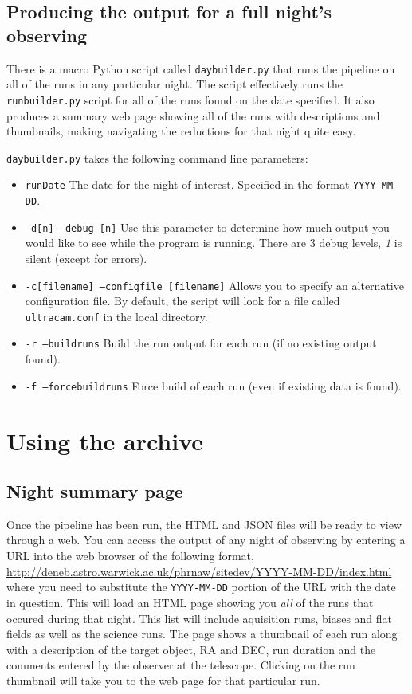 \subsection{Producing the output for a full night's observing}
There is a macro Python script called \texttt{daybuilder.py} that runs the pipeline on all of the runs in any particular night. The script effectively runs the \texttt{runbuilder.py} script for all of the runs found on the date specified. It also produces a summary web page showing all of the runs with descriptions and thumbnails, making navigating the reductions for that night quite easy.

\texttt{daybuilder.py} takes the following command line parameters:
\begin{itemize}
  \item \texttt{runDate} The date for the night of interest. Specified in the format \texttt{YYYY-MM-DD}.
  \item \texttt{-d[n] --debug [n]} Use this parameter to determine how much output you would like to see while the program is running. There are 3 debug levels, \emph{1} is silent (except for errors).
   \item \texttt{-c[filename] --configfile [filename]} Allows you to specify an alternative configuration file. By default, the script will look for a file called \texttt{ultracam.conf} in the local directory. 
  \item \texttt{-r --buildruns} Build the run output for each run (if no existing output found).
  \item \texttt{-f --forcebuildruns}  Force build of each run (even if existing data is found).
\end{itemize}
 

\section{Using the archive} 

\subsection{Night summary page}
Once the pipeline has been run, the HTML and JSON files will be ready to view through a web. You can access the output of any night of observing by entering a URL into the web browser of the following format, \url{http://deneb.astro.warwick.ac.uk/phrnaw/sitedev/YYYY-MM-DD/index.html} where you need to substitute the \texttt{YYYY-MM-DD} portion of the URL with the date in question. This will load an HTML page showing you \emph{all} of the runs that occured during that night. This list will include aquisition runs, biases and flat fields as well as the science runs. The page shows a thumbnail of each run along with a description of the target object, RA and DEC, run duration and the comments entered by the observer at the telescope. Clicking on the run thumbnail will take you to the web page for that particular run. 

